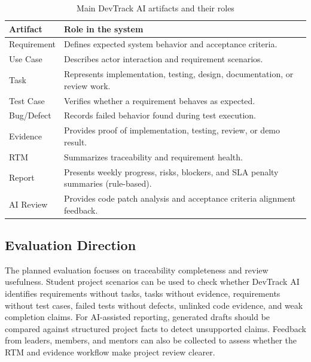 \begin{table}
\centering
\caption{Main DevTrack AI artifacts and their roles}
\begin{tabular}{ll}
\toprule
\textbf{Artifact} & \textbf{Role in the system} \\
\midrule
Requirement & Defines expected system behavior and acceptance criteria. \\
Use Case & Describes actor interaction and requirement scenarios. \\
Task & Represents implementation, testing, design, documentation, or review work. \\
Test Case & Verifies whether a requirement behaves as expected. \\
Bug/Defect & Records failed behavior found during test execution. \\
Evidence & Provides proof of implementation, testing, review, or demo result. \\
RTM & Summarizes traceability and requirement health. \\
Report & Presents weekly progress, risks, blockers, and SLA penalty summaries (rule-based). \\
AI Review & Provides code patch analysis and acceptance criteria alignment feedback. \\
\bottomrule
\end{tabular}
\end{table}

\subsection{Evaluation Direction}

The planned evaluation focuses on traceability completeness and review usefulness.
Student project scenarios can be used to check whether DevTrack AI identifies
requirements without tasks, tasks without evidence, requirements without test cases,
failed tests without defects, unlinked code evidence, and weak completion claims. For
AI-assisted reporting, generated drafts should be compared against structured project
facts to detect unsupported claims. Feedback from leaders, members, and mentors can
also be collected to assess whether the RTM and evidence workflow make project
review clearer.
